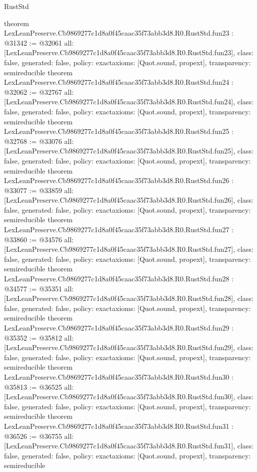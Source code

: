 \begin{lexlean}{RustStd}
\begin{coremodule}
{}
theorem LexLeanPreserve.Cb9869277c1d8a0f45caac35f73abb3d8.R0.RustStd.fun23 : @31342 := @32061 {
  all: [LexLeanPreserve.Cb9869277c1d8a0f45caac35f73abb3d8.R0.RustStd.fun23],
  class: false,
  generated: false,
  policy: exact{axioms: [Quot.sound, propext]},
  transparency: semireducible
}
theorem LexLeanPreserve.Cb9869277c1d8a0f45caac35f73abb3d8.R0.RustStd.fun24 : @32062 := @32767 {
  all: [LexLeanPreserve.Cb9869277c1d8a0f45caac35f73abb3d8.R0.RustStd.fun24],
  class: false,
  generated: false,
  policy: exact{axioms: [Quot.sound, propext]},
  transparency: semireducible
}
theorem LexLeanPreserve.Cb9869277c1d8a0f45caac35f73abb3d8.R0.RustStd.fun25 : @32768 := @33076 {
  all: [LexLeanPreserve.Cb9869277c1d8a0f45caac35f73abb3d8.R0.RustStd.fun25],
  class: false,
  generated: false,
  policy: exact{axioms: [Quot.sound, propext]},
  transparency: semireducible
}
theorem LexLeanPreserve.Cb9869277c1d8a0f45caac35f73abb3d8.R0.RustStd.fun26 : @33077 := @33859 {
  all: [LexLeanPreserve.Cb9869277c1d8a0f45caac35f73abb3d8.R0.RustStd.fun26],
  class: false,
  generated: false,
  policy: exact{axioms: [Quot.sound, propext]},
  transparency: semireducible
}
theorem LexLeanPreserve.Cb9869277c1d8a0f45caac35f73abb3d8.R0.RustStd.fun27 : @33860 := @34576 {
  all: [LexLeanPreserve.Cb9869277c1d8a0f45caac35f73abb3d8.R0.RustStd.fun27],
  class: false,
  generated: false,
  policy: exact{axioms: [Quot.sound, propext]},
  transparency: semireducible
}
theorem LexLeanPreserve.Cb9869277c1d8a0f45caac35f73abb3d8.R0.RustStd.fun28 : @34577 := @35351 {
  all: [LexLeanPreserve.Cb9869277c1d8a0f45caac35f73abb3d8.R0.RustStd.fun28],
  class: false,
  generated: false,
  policy: exact{axioms: [Quot.sound, propext]},
  transparency: semireducible
}
theorem LexLeanPreserve.Cb9869277c1d8a0f45caac35f73abb3d8.R0.RustStd.fun29 : @35352 := @35812 {
  all: [LexLeanPreserve.Cb9869277c1d8a0f45caac35f73abb3d8.R0.RustStd.fun29],
  class: false,
  generated: false,
  policy: exact{axioms: [Quot.sound, propext]},
  transparency: semireducible
}
theorem LexLeanPreserve.Cb9869277c1d8a0f45caac35f73abb3d8.R0.RustStd.fun30 : @35813 := @36525 {
  all: [LexLeanPreserve.Cb9869277c1d8a0f45caac35f73abb3d8.R0.RustStd.fun30],
  class: false,
  generated: false,
  policy: exact{axioms: [Quot.sound, propext]},
  transparency: semireducible
}
theorem LexLeanPreserve.Cb9869277c1d8a0f45caac35f73abb3d8.R0.RustStd.fun31 : @36526 := @36755 {
  all: [LexLeanPreserve.Cb9869277c1d8a0f45caac35f73abb3d8.R0.RustStd.fun31],
  class: false,
  generated: false,
  policy: exact{axioms: [Quot.sound, propext]},
  transparency: semireducible
}
\end{coremodule}
\end{lexlean}
